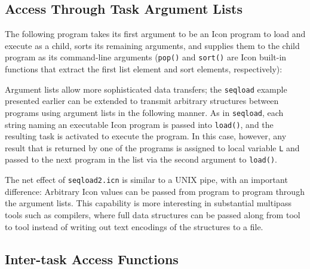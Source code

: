 \subsection{Access Through Task Argument Lists}


The following program takes its first argument to be an Icon program
to load and execute as a child, sorts its remaining arguments, and
supplies them to the child program as its command-line arguments
({\tt pop()} and {\tt sort()} are Icon built-in functions that extract
the first list element and sort elements, respectively):


Argument lists allow more sophisticated data transfers; the {\tt seqload} 
example presented earlier can be extended to transmit arbitrary
structures between programs using argument lists in the following
manner.  As in {\tt seqload}, each string naming an executable Icon
program is passed into {\tt load()}, and the resulting task is
activated to execute the program.  In this case, however, any result
that is returned by one of the programs is assigned to local variable
{\tt L} and passed to the next program in the list via the second
argument to {\tt load()}.


The net effect of {\tt seqload2.icn} is similar to a UNIX pipe, with
an important difference: Arbitrary Icon values can be passed from
program to program through the argument lists.
This capability is more interesting in substantial multipass tools
such as compilers, where full data structures can be passed along from
tool to tool instead of writing out text encodings of the structures
to a file.

\subsection{Inter-task Access Functions}

